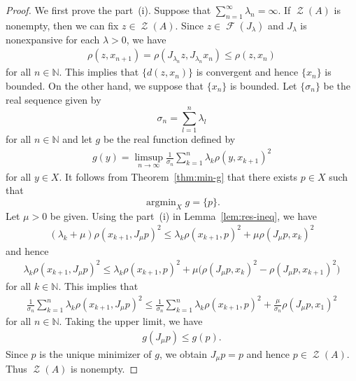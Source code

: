 \documentclass[draft]{amsart}
\numberwithin{equation}{section}
\def\N{\mathbb N}
\DeclareMathOperator*{\Argmin}{argmin}
\DeclareMathOperator{\Fix}{\mathcal{F}}
\DeclareMathOperator{\Zer}{\mathcal{Z}}
\theoremstyle{plain}
\theoremstyle{definition}
\theoremstyle{remark}
\begin{document}
\begin{proof}
 We first prove the part~(i). 
 Suppose that $\sum_{n=1}^{\infty}\lambda_n = \infty$. 
 If $\Zer (A)$ is nonempty, then we can fix $z \in \Zer (A)$. 
 Since $z\in \Fix (J_{\lambda})$ and $J_{\lambda}$ is nonexpansive 
 for each $\lambda>0$, we have 
 \begin{align*}
  \rho(z, x_{n+1}) 
  = \rho(J_{\lambda_n}z, J_{\lambda_n}x_n) 
  \leq \rho(z, x_n)
 \end{align*}
 for all $n\in \N$. This implies that 
 $\bigl\{d(z, x_n)\bigr\}$ is convergent and hence 
 $\{x_n\}$ is bounded. 
 On the other hand, we suppose that $\{x_n\}$ is bounded. 
 Let $\{\sigma_n\}$ be the real sequence given by 
 \[
  \sigma_n = \sum_{l=1}^{n} \lambda_l
 \]
 for all $n\in \N$ and let $g$ be the real function defined by 
 \begin{align*}
  g(y) = \limsup_{n\to \infty} 
 \frac{1}{\sigma_n} \sum_{k=1}^n 
 \lambda_k \rho(y, x_{k+1})^2 
 \end{align*}
 for all $y\in X$. 
 It follows from Theorem~\ref{thm:min-g} that 
 there exists $p \in X$ such that 
 \[
  \Argmin_X g=\{p\}. 
 \]
 Let $\mu>0$ be given. 
 Using the part~(i) in Lemma~\ref{lem:res-ineq}, we have 
 \begin{align*}
  (\lambda_k + \mu) \rho (x_{k+1}, J_{\mu}p)^2 
  \leq \lambda_k \rho(x_{k+1}, p)^2 
 +\mu \rho(J_{\mu}p, x_{k})^2
 \end{align*}
 and hence 
 \begin{align*}
  \lambda_k \rho(x_{k+1}, J_{\mu}p)^2 
  \leq \lambda_k \rho(x_{k+1}, p)^2 
 +\mu \bigl(
  \rho(J_{\mu}p, x_{k})^2 - \rho(J_{\mu}p, x_{k+1})^2
 \bigr)
 \end{align*}
 for all $k\in \N$. This implies that 
 \begin{align*}
  \frac{1}{\sigma_n} \sum_{k=1}^n \lambda_k \rho(x_{k+1}, J_{\mu}p)^2 
  \leq   
 \frac{1}{\sigma_n} \sum_{k=1}^n \lambda_k \rho(x_{k+1}, p)^2  
  + \frac{\mu}{\sigma_n}\rho(J_{\mu}p, x_1)^2
 \end{align*} 
 for all $n\in \N$. Taking the upper limit, we have 
 \begin{align*}
  g(J_{\mu}p) \leq g(p). 
 \end{align*}
 Since $p$ is the unique minimizer of $g$, we obtain 
 $J_{\mu}p=p$ and hence $p\in \Zer (A)$. 
 Thus $\Zer (A)$ is nonempty. 


\end{proof}
\end{document}
